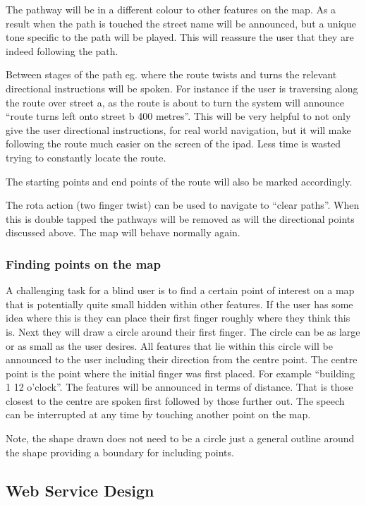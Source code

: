 \documentclass[11pt,twoside,a4paper]{article}
\begin{document}
The pathway will be in a different colour to other features on the
map. As a result when the path is touched the street name will be
announced, but a unique tone specific to the path will be played. This
will reassure the user that they are indeed following the path.

Between stages of the path eg. where the route twists and turns the
relevant directional instructions will be spoken. For instance if the
user is traversing along the route over street a, as the route is about
to turn the system will announce ``route turns left onto street b 400
metres''. This will be very helpful to not only give the user
directional instructions, for real world navigation, but it will make
following the route much easier on the screen of the ipad. Less time is
wasted trying to constantly locate the route.

The starting points and end points of the route will also be marked
accordingly.

The rota action (two finger twist) can be used to navigate to ``clear
paths''. When this is double tapped the pathways will be removed as will
the directional points discussed above. The map will behave normally
again.

\subsubsection{Finding points on the map}

A challenging task for a blind user is to find a certain point of
interest on a map that is potentially quite small hidden within other
features. If the user has some idea where this is they can place their
first finger roughly where they think this is. Next they will draw a
circle around their first finger. The circle can be as large or as small
as the user desires. All features that lie within this circle will be
announced to the user including their direction from the centre
point. The centre point is the point where the initial finger was first
placed. For example ``building 1 12 o'clock''. The features will be
announced in terms of distance. That is those closest to the centre are
spoken first followed by those further out. The speech can be
interrupted at any time by touching another point on the map.

Note, the shape drawn does not need to be a circle just a general
outline around the shape providing a boundary for including points.

\subsection{Web Service Design}
\end{document}
